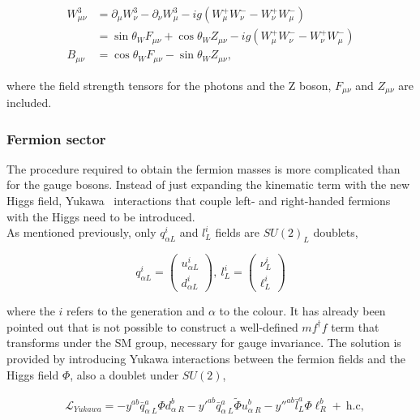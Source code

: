 \begin{equation}
\begin{split}
    W_{\mu\nu}^3 &= \partial_\mu W_\nu^3 - \partial_\nu W_\mu^3 - ig(W_\mu^+W_\nu^- - W_\nu^+ W_\mu^-)\\
    &= \sin\theta_W F_{\mu\nu} + \cos\theta_W Z_{\mu\nu} - ig(W_\mu^+W_\nu^- - W_\nu^+ W_\mu^-)\\
    B_{\mu\nu} &= \cos\theta_W F_{\mu\nu} - \sin\theta_W Z_{\mu\nu},
\end{split}
\end{equation}

where the field strength tensors for the photons and the Z boson, $F_{\mu\nu}$ and $Z_{\mu\nu}$ are included.

\subsubsection{Fermion sector}%

The procedure required to obtain the fermion masses is more complicated than for the gauge bosons. Instead of just expanding the kinematic term with the new Higgs field, Yukawa~\cite{yukawa} interactions that couple left- and right-handed fermions with the Higgs need to be introduced.\\

As mentioned previously, only $q_{\alpha L}^i$ and $l^i_L$ fields are $SU(2)_L$ doublets,

\begin{equation}
    \label{Theory_eq:SUdoublets}
    q_{\alpha L}^i=\begin{pmatrix} u^i_{\alpha L} \\ d^i_{\alpha L} \end{pmatrix},\ l_L^i = \begin{pmatrix} \nu^i_L \\ \ell^i_L \end{pmatrix}
\end{equation}

where the $i$ refers to the generation and $\alpha$ to the colour. It has already been pointed out that is not possible to construct a well-defined $mf^\dag f$ term that transforms under the SM group, necessary for gauge invariance. The solution is provided by introducing Yukawa interactions between the fermion fields and the Higgs field $\Phi$, also a doublet under $SU(2)$,

\begin{equation}
\begin{split}
    &\mathcal{L}_{Yukawa} = -y^{ab}\bar{q}^a_{\alpha\ L}\Phi d^b_{\alpha\ R} - y'^{ab}\bar{q}^a_{\alpha\ L}\tilde{\Phi} u^b_{\alpha\ R}-y''^{ab}\bar{l}^a_{L}\Phi \ell^b_{R}+\ \text{h.c},\\
\end{split}
\end{equation}

